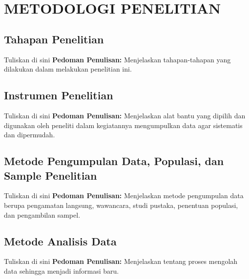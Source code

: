 \chapter{METODOLOGI PENELITIAN}
\section{Tahapan Penelitian}


Tuliskan di sini \textbf{Pedoman Penulisan:} Menjelaskan tahapan-tahapan yang dilakukan dalam melakukan penelitian ini.


\section{Instrumen Penelitian}


Tuliskan di sini \textbf{Pedoman Penulisan:} Menjelaskan alat bantu yang dipilih dan digunakan oleh peneliti dalam kegiatannya mengumpulkan data agar sistematis dan dipermudah.


\section{Metode Pengumpulan Data, Populasi, dan Sample Penelitian}


Tuliskan di sini \textbf{Pedoman Penulisan:} Menjelaskan metode pengumpulan data berupa pengamatan langsung, wawancara, studi pustaka, penentuan populasi, dan pengambilan sampel.


\section{Metode Analisis Data}


Tuliskan di sini \textbf{Pedoman Penulisan:} Menjelaskan tentang proses mengolah data sehingga menjadi informasi baru.


